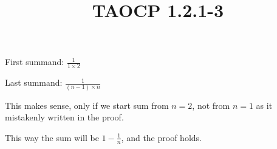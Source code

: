 \documentclass{article}
\title{TAOCP 1.2.1\mbox{-}3}
\begin{document}
\maketitle

First summand: \( \frac{1}{1 \times 2} \)

Last summand: \( \frac{1}{(n-1) \times n} \)

This makes sense, only if we start sum from \( n = 2 \), not from \( n = 1 \) as it mistakenly written in the proof.

This way the sum will be \( 1 - \frac{1}{n} \), and the proof holds.
\end{document}
